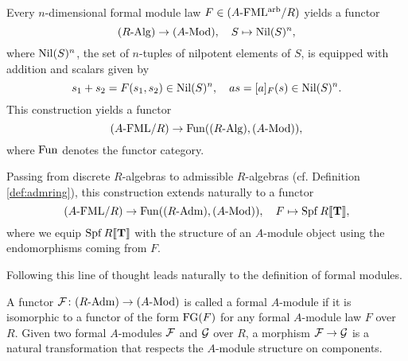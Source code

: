 \documentclass[../main.tex]{subfiles}
\begin{document}
Every $n$-dimensional formal module law $F \in {({A}\textnormal-\allowbreak\mathrm{FML^{arb}}/{R})}$
yields a functor
\begin{equation}\label{eq:fmnilpfunc}
  {({R}\textnormal-\allowbreak\mathrm{Alg})} \to {({A}\textnormal-\allowbreak\mathrm{Mod})}, \quad S \mapsto {\operatorname{Nil}}(S)^n,
\end{equation}
where ${\operatorname{Nil}}(S)^n$, the set of $n$-tuples of nilpotent elements of $S$, is
equipped with addition and scalars given by 
\begin{equation*}
  s_1 + s_2 = F(s_1, s_2) \in {\operatorname{Nil}}(S)^n, \quad a s = [a]_F(s) \in {\operatorname{Nil}}(S)^n.
\end{equation*}
This construction yields a functor 
\begin{equation}\label{eq:formfunc}
  {({A}\textnormal-\allowbreak\mathrm{FML}/{R})} \to \operatorname{Fun}({({R}\textnormal-\allowbreak\mathrm{Alg})}, {({A}\textnormal-\allowbreak\mathrm{Mod})}),
\end{equation}
where $\operatorname{Fun}$ denotes the functor category.

Passing from discrete $R$-algebras to admissible $R$-algebras (cf. Definition
\ref{def:admring}), this construction extends naturally to a functor 
\begin{equation*}
  {({A}\textnormal-\allowbreak\mathrm{FML}/{R})} \to \operatorname{Fun} ({({R}\textnormal-\allowbreak\mathrm{Adm})}, {({A}\textnormal-\allowbreak\mathrm{Mod})}), \quad F \mapsto \operatorname{Spf}
  R\llbracket \mathbf{T} \rrbracket,
\end{equation*}
where we equip $\operatorname{Spf} R \llbracket \mathbf{T} \rrbracket$ with the structure of an $A$-module object
using the endomorphisms coming from $F$. 

Following this line of thought leads naturally to the definition of
formal modules. 

\begin{defi}
  A functor $\mathcal{F} \colon {({R}\textnormal-\allowbreak\mathrm{Adm})} \to {({A}\textnormal-\allowbreak\mathrm{Mod})}$ is called a formal $A$-module if it
  is isomorphic to a functor of the form $\textnormal{FG}(F)$ for
  any formal $A$-module law $F$ over $R$. Given two formal $A$-modules $\mathcal{F}$
  and $\mathcal{G}$ over $R$, a
  morphism $\mathcal{F} \to \mathcal{G}$ is a natural transformation that respects the 
  $A$-module structure on components.
\end{defi}

\end{document}
